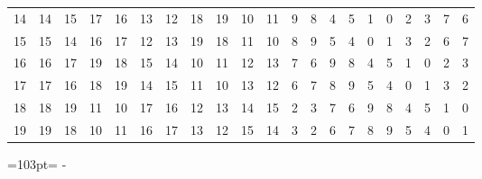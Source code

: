 \documentclass[10pt,a4paper]{article}
\newcommand{\needspace}[1]{\par\penalty-100\begingroup\dimen0=#1\relax\dimen2=\pagegoal
  \advance\dimen2-\pagetotal\ifdim\dimen0>\dimen2\relax\ifdim\dimen2>0pt\vfil\break\fi\fi
  \endgroup}
\numberwithin{equation}{section}
\begin{document}
{\begin{longtable}{@{}r|rrrrrrrrrrrrrrrrrrrr@{}}
14 & 14 & 15 & 17 & 16 & 13 & 12 & 18 & 19 & 10 & 11 & 9 & 8 & 4 & 5 & 1 & 0 & 2 & 3 & 7 & 6\\
15 & 15 & 14 & 16 & 17 & 12 & 13 & 19 & 18 & 11 & 10 & 8 & 9 & 5 & 4 & 0 & 1 & 3 & 2 & 6 & 7\\
16 & 16 & 17 & 19 & 18 & 15 & 14 & 10 & 11 & 12 & 13 & 7 & 6 & 9 & 8 & 4 & 5 & 1 & 0 & 2 & 3\\
17 & 17 & 16 & 18 & 19 & 14 & 15 & 11 & 10 & 13 & 12 & 6 & 7 & 8 & 9 & 5 & 4 & 0 & 1 & 3 & 2\\
18 & 18 & 19 & 11 & 10 & 17 & 16 & 12 & 13 & 14 & 15 & 2 & 3 & 7 & 6 & 9 & 8 & 4 & 5 & 1 & 0\\*
19 & 19 & 18 & 10 & 11 & 16 & 17 & 13 & 12 & 15 & 14 & 3 & 2 & 6 & 7 & 8 & 9 & 5 & 4 & 0 & 1\\
\bottomrule\end{longtable}}
\needspace{103pt}
\end{document}
